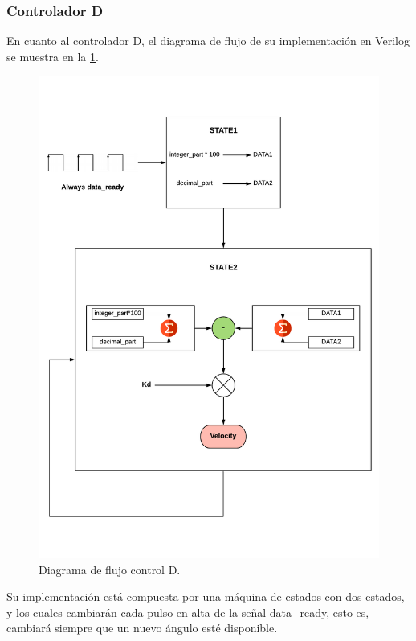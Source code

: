 \subsubsection{Controlador D} \label{sec:ControladorD}

En cuanto al controlador D, el diagrama de flujo de su implementación en Verilog se muestra en la \ref{fig:D_control}. 
	\begin{figure}[H]
	\center
	\includegraphics[trim = 0cm 0cm 0mm 0cm, clip,scale=0.4]{imagenes/Balancing_robot/D.pdf}
	\caption{Diagrama de flujo control D.}
	\label{fig:D_control}
\end{figure}

Su implementación está compuesta por una máquina de estados con dos estados, y los cuales cambiarán cada pulso en alta de la señal data_ready, esto es, cambiará siempre que un nuevo ángulo esté disponible.\newline

